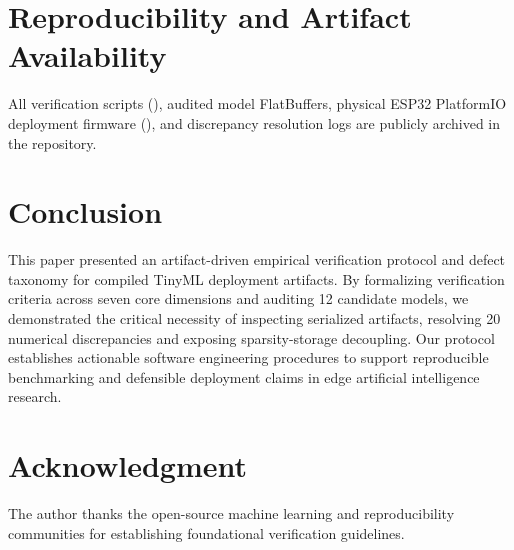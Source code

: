 \documentclass[journal]{IEEEtran}
\begin{document}
\section{Reproducibility and Artifact Availability}
All verification scripts (), audited model FlatBuffers, physical ESP32 PlatformIO deployment firmware (), and discrepancy resolution logs are publicly archived in the repository.

\section{Conclusion}
This paper presented an artifact-driven empirical verification protocol and defect taxonomy for compiled TinyML deployment artifacts. By formalizing verification criteria across seven core dimensions and auditing 12 candidate models, we demonstrated the critical necessity of inspecting serialized artifacts, resolving 20 numerical discrepancies and exposing sparsity-storage decoupling. Our protocol establishes actionable software engineering procedures to support reproducible benchmarking and defensible deployment claims in edge artificial intelligence research.

\section*{Acknowledgment}
The author thanks the open-source machine learning and reproducibility communities for establishing foundational verification guidelines.



\end{document}
